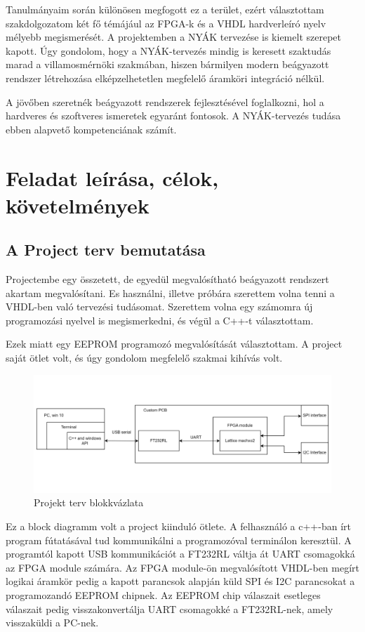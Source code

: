 \documentclass[a4paper,12pt,oneside]{book}
\begin{document}
Tanulmányaim során különösen megfogott ez a terület, ezért választottam szakdolgozatom két fő témájául az FPGA-k és a VHDL hardverleíró nyelv mélyebb megismerését. A projektemben a NYÁK tervezése is kiemelt szerepet kapott. Úgy gondolom, hogy a NYÁK-tervezés mindig is keresett szaktudás marad a villamosmérnöki szakmában, hiszen bármilyen modern beágyazott rendszer létrehozása elképzelhetetlen megfelelő áramköri integráció nélkül. 

A jövőben szeretnék beágyazott rendszerek fejlesztésével foglalkozni, hol a hardveres és szoftveres ismeretek egyaránt fontosok. A NYÁK-tervezés tudása ebben alapvető kompetenciának számít.

\chapter{Feladat leírása, célok, követelmények}
\section{A Project terv bemutatása}
Projectembe egy összetett, de egyedül megvalósítható beágyazott rendszert akartam megvalósítani. Es használni, illetve próbára szerettem volna tenni a VHDL-ben való tervezési tudásomat. Szerettem volna egy számomra új programozási nyelvel is megismerkedni, és végül a C++-t választottam.

Ezek miatt egy EEPROM programozó megvalósítását választottam. A project saját ötlet volt, és úgy gondolom megfelelő szakmai kihívás volt.
\begin{figure}[H]
	\centering
	\includegraphics[trim=1mm 1mm 1mm 1mm,scale=0.245]{terv1.png}
	\caption{Projekt terv blokkvázlata}
	\label{Projekt terv}
\end{figure}
Ez a block diagramm volt a project kiinduló ötlete. A felhasználó a c++-ban írt program fútatásával tud kommunikálni a programozóval terminálon keresztül. A programtól kapott  USB kommunikációt a FT232RL váltja át UART csomagokká az FPGA module számára. Az FPGA module-ön megvalósított VHDL-ben megírt logikai áramkör pedig a kapott parancsok alapján küld SPI és I2C parancsokat a programozandó EEPROM chipnek. Az EEPROM chip válaszait esetleges válaszait pedig visszakonvertálja UART csomagokké a FT232RL-nek, amely visszaküldi a PC-nek.
\end{document}
